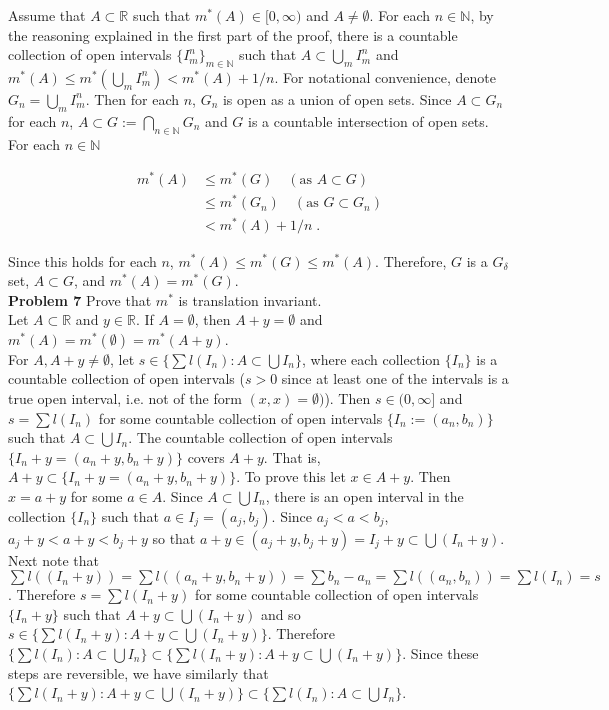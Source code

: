 \documentclass[a4paper]{article}
\begin{document}
Assume that $A \subset \mathbb{R}$ such that $m^*(A) \in [0,\infty)$ and $A \neq \emptyset$. For each $n \in \mathbb{N}$, by the reasoning explained in the first part of the proof, there is a countable collection of open intervals $\{I_m^n\}_{m \in \mathbb{N}}$ such that $A \subset \bigcup_{m} I_m^n$ and $m^*(A) \leq m^*\left(\bigcup_{m} I_m^n \right) < m^*(A) + 1/n$. For notational convenience, denote $G_n = \bigcup_{m} I_m^n$. Then for each $n$, $G_n$ is open as a union of open sets. Since $A \subset G_n$ for each $n$, $A \subset G:= \bigcap_{n \in \mathbb{N}} G_n$ and $G$ is a countable intersection of open sets. For each $n \in \mathbb{N}$

\begin{align*}
m^*(A) &\leq m^*(G) \quad (\text{as } A \subset G)\\
&\leq m^*(G_n) \quad (\text{as } G \subset G_n)\\
&< m^*(A) + 1/n \;.
\end{align*}

Since this holds for each $n$, $m^*(A) \leq m^*(G) \leq m^*(A)$. Therefore, $G$ is a $G_\delta$ set, $A\subset G$, and $m^*(A) = m^*(G)$. \\

{\bf Problem 7} Prove that $m^*$ is translation invariant.\\

Let $A \subset \mathbb{R}$ and $y \in \mathbb{R}$.
If $A = \emptyset$, then $A+y = \emptyset$ and $m^*(A) = m^*(\emptyset) = m^*(A+y)$. \\

For $A,A+y \neq \emptyset$, let $s \in \{\sum l(I_n) : A \subset \bigcup I_n \}$, where each collection $\{I_n\}$ is a countable collection of open intervals ($s > 0$ since at least one of the intervals is a true open interval, i.e. not of the form $(x,x) = \emptyset)$). Then $s \in (0,\infty]$ and $s = \sum l(I_n)$ for some countable collection of open intervals $\{I_n := (a_n,b_n)\}$ such that $A \subset \bigcup I_n$. The countable collection of open intervals $\{I_n + y = (a_n + y, b_n + y)\}$ covers $A + y$. That is, $A + y \subset \{I_n + y = (a_n + y, b_n + y)\}$. To prove this let $x \in A+y$. Then $x = a+y$ for some $a \in A$. Since $A\subset \bigcup I_n$, there is an open interval in the collection $\{I_n\}$ such that $a \in I_j = (a_j,b_j)$. Since $a_j < a<b_j$, $a_j + y < a+ y < b_j + y$ so that $a+y \in (a_j + y, b_j + y) = I_j + y \subset \bigcup (I_n + y)$. Next note that $\sum l((I_n + y)) = \sum l((a_n + y, b_n+y)) = \sum b_n - a_n = \sum l((a_n,b_n)) = \sum l(I_n) = s$. Therefore $s = \sum l(I_n +y)$ for some countable collection of open intervals $\{I_n + y\}$ such that $A+y \subset \bigcup (I_n + y)$ and so $s \in \{\sum l(I_n + y) : A +y\subset \bigcup (I_n+y) \}$. Therefore $\{\sum l(I_n) : A \subset \bigcup I_n \} \subset \{\sum l(I_n + y) : A +y\subset \bigcup (I_n+y) \}$. Since these steps are reversible, we have similarly that $\{\sum l(I_n+y) : A +y\subset \bigcup (I_n+y) \} \subset \{\sum l(I_n) : A \subset \bigcup I_n \}$.\\
\end{document}
